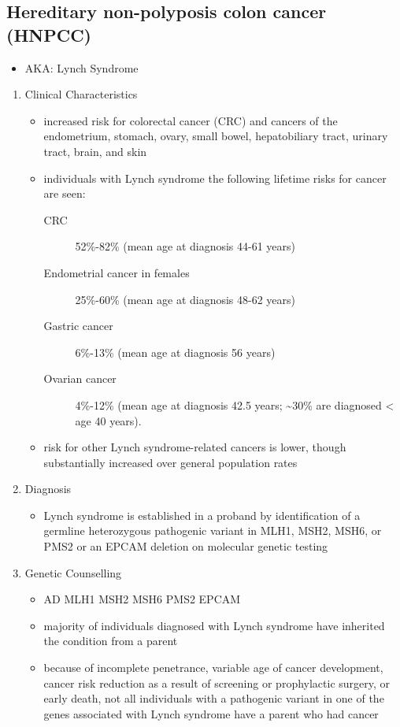 \documentclass[12pt]{scrartcl}
\begin{document}
\subsection{Hereditary non-polyposis colon cancer (HNPCC)}
\label{sec:orgda0f1ce}
\begin{itemize}
\item AKA: Lynch Syndrome
\end{itemize}
\begin{enumerate}
\item Clinical Characteristics
\label{sec:orgdba8f6b}
\begin{itemize}
\item increased risk for colorectal cancer (CRC) and cancers of the
endometrium, stomach, ovary, small bowel, hepatobiliary tract,
urinary tract, brain, and skin

\item individuals with Lynch syndrome the following lifetime risks for
cancer are seen:
\begin{description}
\item[{CRC}] 52\%-82\% (mean age at diagnosis 44-61 years)
\item[{Endometrial cancer in females}] 25\%-60\% (mean age at diagnosis 48-62 years)
\item[{Gastric cancer}] 6\%-13\% (mean age at diagnosis 56 years)
\item[{Ovarian cancer}] 4\%-12\% (mean age at diagnosis 42.5 years; \textasciitilde{}30\% are diagnosed < age 40 years).
\end{description}

\item risk for other Lynch syndrome-related cancers is lower, though
substantially increased over general population rates
\end{itemize}

\item Diagnosis
\label{sec:org232566b}
\begin{itemize}
\item Lynch syndrome is established in a proband by identification of a
germline heterozygous pathogenic variant in MLH1, MSH2, MSH6, or
PMS2 or an EPCAM deletion on molecular genetic testing
\end{itemize}

\item Genetic Counselling
\label{sec:org6e2af3b}
\begin{itemize}
\item AD MLH1 MSH2 MSH6 PMS2 EPCAM
\item majority of individuals diagnosed with Lynch syndrome have
inherited the condition from a parent
\item because of incomplete penetrance, variable age of cancer
development, cancer risk reduction as a result of screening or
prophylactic surgery, or early death, not all individuals with a
pathogenic variant in one of the genes associated with Lynch
syndrome have a parent who had cancer
\end{itemize}


\end{enumerate}
\end{document}
